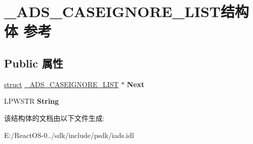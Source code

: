 \hypertarget{struct___a_d_s___c_a_s_e_i_g_n_o_r_e___l_i_s_t}{}\section{\+\_\+\+A\+D\+S\+\_\+\+C\+A\+S\+E\+I\+G\+N\+O\+R\+E\+\_\+\+L\+I\+S\+T结构体 参考}
\label{struct___a_d_s___c_a_s_e_i_g_n_o_r_e___l_i_s_t}
\subsection*{Public 属性}
\begin{DoxyCompactItemize}
\item 
\mbox{\label{struct___a_d_s___c_a_s_e_i_g_n_o_r_e___l_i_s_t_a9903b4d73601260cd67c64dbd4041a11}} 
\hyperlink{interfacestruct}{struct} \hyperlink{struct___a_d_s___c_a_s_e_i_g_n_o_r_e___l_i_s_t}{\+\_\+\+A\+D\+S\+\_\+\+C\+A\+S\+E\+I\+G\+N\+O\+R\+E\+\_\+\+L\+I\+ST} $\ast$ {\bfseries Next}
\item 
\mbox{\label{struct___a_d_s___c_a_s_e_i_g_n_o_r_e___l_i_s_t_a421b12e0811b2fbb168a761e4d774924}} 
L\+P\+W\+S\+TR {\bfseries String}
\end{DoxyCompactItemize}


该结构体的文档由以下文件生成\+:\begin{DoxyCompactItemize}
\item 
E\+:/\+React\+O\+S-\/0../sdk/include/psdk/iads.\+idl\end{DoxyCompactItemize}
